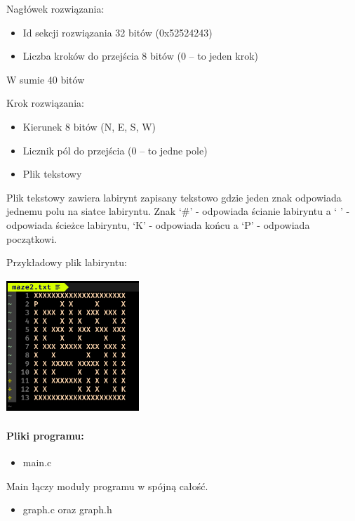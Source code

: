 \documentclass[
]{article}
\begin{document}
Nagłówek rozwiązania:

\begin{itemize}
\item
  Id sekcji rozwiązania 32 bitów (0x52524243)
\item
  Liczba kroków do przejścia 8 bitów (0 -- to jeden krok)
\end{itemize}

W sumie 40 bitów

Krok rozwiązania:

\begin{itemize}
\item
  Kierunek 8 bitów (N, E, S, W)
\item
  Licznik pól do przejścia (0 -- to jedne pole)
\end{itemize}

\begin{itemize}
\item
  Plik tekstowy
\end{itemize}

Plik tekstowy zawiera labirynt zapisany tekstowo gdzie jeden znak
odpowiada jednemu polu na siatce labiryntu. Znak `\#' - odpowiada
ścianie labiryntu a ` ' - odpowiada ścieżce labiryntu, `K' - odpowiada
końcu a `P' - odpowiada początkowi.

Przykładowy plik labiryntu:

\includegraphics[width=5cm, height=5cm]{plik.png}


\hypertarget{pliki-programu}{%
\paragraph{Pliki programu:}\label{pliki-programu}}

\begin{itemize}
\item
  main.c
\end{itemize}

Main łączy moduły programu w spójną całość.

\begin{itemize}
\item
  graph.c oraz graph.h
\end{itemize}
\end{document}
